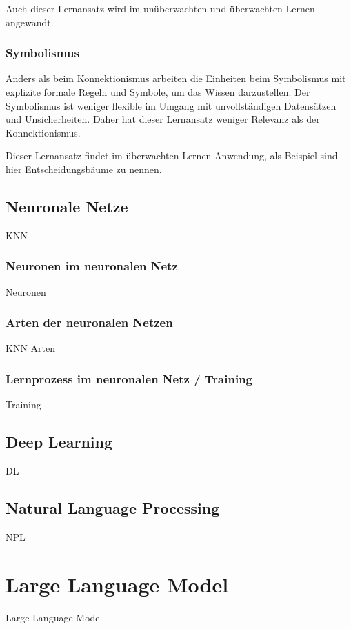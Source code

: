 Auch dieser Lernansatz wird im unüberwachten und überwachten Lernen angewandt.

\subsubsection{Symbolismus}
Anders als beim Konnektionismus arbeiten die Einheiten beim Symbolismus mit explizite formale Regeln und Symbole, um das Wissen darzustellen. Der Symbolismus ist weniger flexible im Umgang mit unvollständigen Datensätzen und Unsicherheiten. Daher hat dieser Lernansatz weniger Relevanz als der Konnektionismus.\vspace{0.2cm}

Dieser Lernansatz findet im überwachten Lernen Anwendung, als Beispiel sind hier Entscheidungsbäume zu nennen.


\subsection{Neuronale Netze}
KNN

\subsubsection{Neuronen im neuronalen Netz}
Neuronen

\subsubsection{Arten der neuronalen Netzen}
KNN Arten

\subsubsection{Lernprozess im neuronalen Netz / Training}
Training

\subsection{Deep Learning}
DL

\subsection{Natural Language Processing}
NPL

\section{Large Language Model}
Large Language Model

